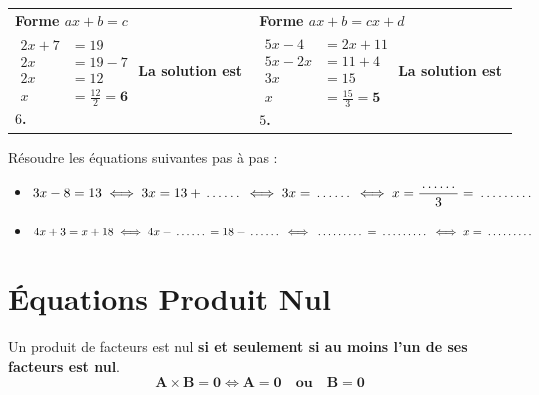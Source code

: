 \begin{cadremethode}[Résolution des équations types $ax + b = c$ et $ax + b = cx + d$]
\begin{center}
\renewcommand{\arraystretch}{1.5}
\begin{tabularx}{\linewidth}{X|X}
\rowcolor{colDefBg}
\centering \textbf{Forme $ax + b = c$} & \centering \textbf{Forme $ax + b = cx + d$} \tabularnewline
$\begin{aligned}
2x + 7 &= 19 \\
2x &= 19 - 7 \\
2x &= 12 \\
x &= \frac{12}{2} = \mathbf{6}
\end{aligned}$
\newline
\textbf{La solution est $6$.}
&
$\begin{aligned}
5x - 4 &= 2x + 11 \\
5x - 2x &= 11 + 4 \\
3x &= 15 \\
x &= \frac{15}{3} = \mathbf{5}
\end{aligned}$
\newline
\textbf{La solution est $5$.}
\tabularnewline
\end{tabularx}
\end{center}
\end{cadremethode}

\begin{cadreexemple}
Résoudre les équations suivantes pas à pas :
\begin{itemize}
    \item $3x - 8 = 13 \iff 3x = 13 + \pointille[1cm] \iff 3x = \pointille[1cm] \iff x = \dfrac{\pointille[1cm]}{3} = \pointille[1.5cm]$
    \item $4x + 3 = x + 18 \iff 4x - \pointille[1cm] = 18 - \pointille[1cm] \iff \pointille[1.5cm] = \pointille[1.5cm] \iff x = \pointille[1.5cm]$
\end{itemize}
\end{cadreexemple}

\section{Équations Produit Nul}

\begin{cadreprop}
Un produit de facteurs est nul \textbf{si et seulement si au moins l'un de ses facteurs est nul}.
\[ \mathbf{A \times B = 0 \iff A = 0 \quad \text{ou} \quad B = 0} \]
\end{cadreprop}

